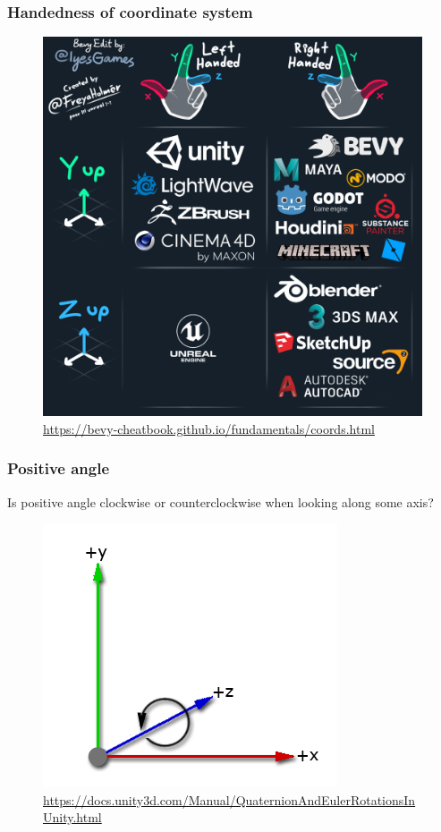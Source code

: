 \documentclass{beamer}
\begin{document}
\begin{frame}
\frametitle{Handedness of coordinate system}
\begin{figure}
    \centering
    \includegraphics[width=0.8\textheight]{assets/3D_soft_handedness.png}
	\caption*{\url{https://bevy-cheatbook.github.io/fundamentals/coords.html}}
\end{figure}
\end{frame}

\begin{frame}
\frametitle{Positive angle}
Is positive angle clockwise or counterclockwise when looking along some axis?
\begin{figure}
    \centering
    \includegraphics[width=0.7\textheight]{assets/unity-axis-with-rotation_positive_angle.png}
	\caption*{\url{https://docs.unity3d.com/Manual/QuaternionAndEulerRotationsInUnity.html}}
\end{figure}
\end{frame}
\end{document}
